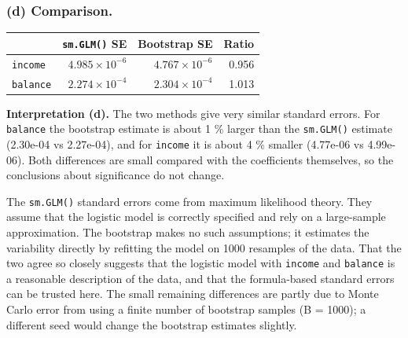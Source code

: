 \documentclass[11pt]{article}
\begin{document}
\subsubsection*{(d) Comparison.}

\begin{table}[H]
  \centering
  \begin{tabular}{lrrr}
    \toprule
    & \texttt{sm.GLM()} SE & Bootstrap SE & Ratio \\
    \midrule
    \texttt{income} & $4.985 \times 10^{-6}$ & $4.767 \times 10^{-6}$ & 0.956 \\
    \texttt{balance} & $2.274 \times 10^{-4}$ & $2.304 \times 10^{-4}$ & 1.013 \\
    \bottomrule
  \end{tabular}
\end{table}

\textbf{Interpretation (d).} The two methods give very similar standard errors. For \texttt{balance} the bootstrap estimate is about 1 \% larger than the \texttt{sm.GLM()} estimate (2.30e-04 vs 2.27e-04), and for \texttt{income} it is about 4 \% smaller (4.77e-06 vs 4.99e-06). Both differences are small compared with the coefficients themselves, so the conclusions about significance do not change.

The \texttt{sm.GLM()} standard errors come from maximum likelihood theory. They assume that the logistic model is correctly specified and rely on a large-sample approximation. The bootstrap makes no such assumptions; it estimates the variability directly by refitting the model on 1000 resamples of the data. That the two agree so closely suggests that the logistic model with \texttt{income} and \texttt{balance} is a reasonable description of the data, and that the formula-based standard errors can be trusted here. The small remaining differences are partly due to Monte Carlo error from using a finite number of bootstrap samples (B = 1000); a different seed would change the bootstrap estimates slightly.
\end{document}
